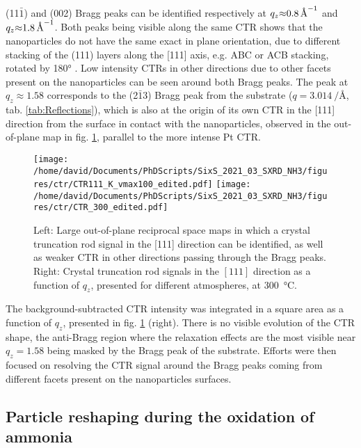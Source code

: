(11$\bar{1}$) and (002) Bragg peaks can be identified respectively at $q_z \qty{\approx0.8}{\per\angstrom}$ and $q_z \qty{\approx1.8}{\per\angstrom}$.
Both peaks being visible along the same CTR shows that the nanoparticles do not have the same exact in plane orientation, due to different stacking of the (111) layers along the [111] axis, e.g. ABC or ACB stacking, rotated by \ang{180} \parencite{Jones2019}.
Low intensity CTRs in other directions due to other facets present on the nanoparticles can be seen around both Bragg peaks.
The peak at $q_z\approx1.58$ corresponds to the (2$\bar{1}$3) Bragg peak from the  substrate ($q = \qty{3.014}{\per\angstrom}$, tab. \ref{tab:Reflections}), which is also at the origin of its own CTR in the [111] direction from the surface in contact with the nanoparticles, observed in the out-of-plane map in fig. \ref{fig:2DCTR111Particles}, parallel to the more intense Pt CTR.

\begin{figure}[!htb]
    \centering
    \texttt{[image: /home/david/Documents/PhDScripts/SixS\_2021\_03\_SXRD\_NH3/figures/ctr/CTR111\_K\_vmax100\_edited.pdf]}
    \texttt{[image: /home/david/Documents/PhDScripts/SixS\_2021\_03\_SXRD\_NH3/figures/ctr/CTR\_300\_edited.pdf]}
    \caption{
        Left: Large out-of-plane reciprocal space maps in which a crystal truncation rod signal in the [111] direction can be identified, as well as weaker CTR in other directions passing through the Bragg peaks.
        Right: Crystal truncation rod signals in the $[111]$ direction as a function of $q_z$, presented for different atmospheres, at \qty{300}{\degreeCelsius}.
    }
    \label{fig:2DCTR111Particles}
\end{figure}

The background-subtracted CTR intensity was integrated in a square area as a function of $q_z$, presented in fig. \ref{fig:2DCTR111Particles} (right).
There is no visible evolution of the CTR shape, the anti-Bragg region where the relaxation effects are the most visible near $q_z=1.58$ being masked by the Bragg peak of the substrate.
Efforts were then focused on resolving the CTR signal around the Bragg peaks coming from different facets present on the nanoparticles surfaces.

\subsection{Particle reshaping during the oxidation of ammonia}

